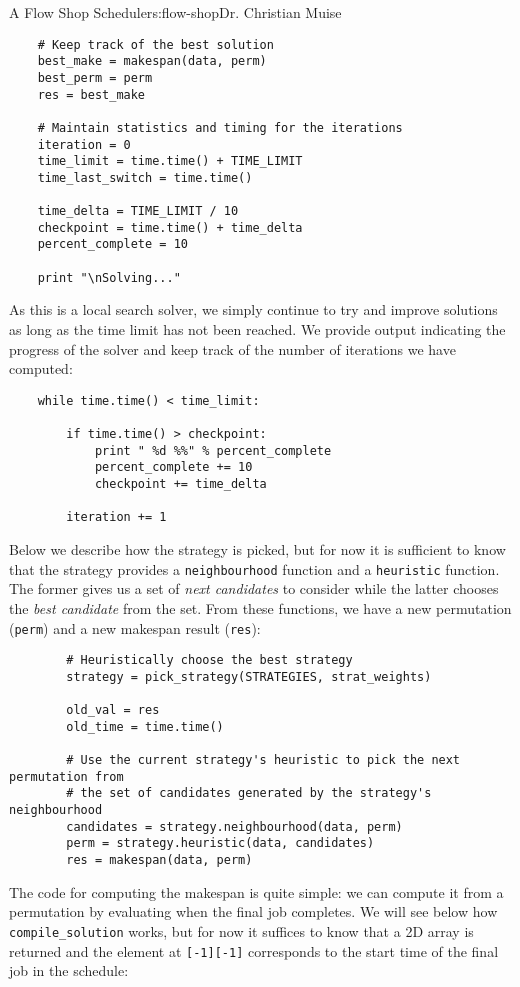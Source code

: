 \begin{aosachapter}{A Flow Shop Scheduler}{s:flow-shop}{Dr. Christian Muise}
\begin{verbatim}
    # Keep track of the best solution
    best_make = makespan(data, perm)
    best_perm = perm
    res = best_make

    # Maintain statistics and timing for the iterations
    iteration = 0
    time_limit = time.time() + TIME_LIMIT
    time_last_switch = time.time()

    time_delta = TIME_LIMIT / 10
    checkpoint = time.time() + time_delta
    percent_complete = 10

    print "\nSolving..."
\end{verbatim}

As this is a local search solver, we simply continue to try and improve
solutions as long as the time limit has not been reached. We provide
output indicating the progress of the solver and keep track of the
number of iterations we have computed:

\begin{verbatim}
    while time.time() < time_limit:

        if time.time() > checkpoint:
            print " %d %%" % percent_complete
            percent_complete += 10
            checkpoint += time_delta

        iteration += 1
\end{verbatim}

Below we describe how the strategy is picked, but for now it is
sufficient to know that the strategy provides a \texttt{neighbourhood}
function and a \texttt{heuristic} function. The former gives us a set of
\emph{next candidates} to consider while the latter chooses the
\emph{best candidate} from the set. From these functions, we have a new
permutation (\texttt{perm}) and a new makespan result (\texttt{res}):

\begin{verbatim}
        # Heuristically choose the best strategy
        strategy = pick_strategy(STRATEGIES, strat_weights)

        old_val = res
        old_time = time.time()

        # Use the current strategy's heuristic to pick the next permutation from
        # the set of candidates generated by the strategy's neighbourhood
        candidates = strategy.neighbourhood(data, perm)
        perm = strategy.heuristic(data, candidates)
        res = makespan(data, perm)
\end{verbatim}

The code for computing the makespan is quite simple: we can compute it
from a permutation by evaluating when the final job completes. We will
see below how \texttt{compile\_solution} works, but for now it suffices
to know that a 2D array is returned and the element at
\texttt{{[}-1{]}{[}-1{]}} corresponds to the start time of the final job
in the schedule:


\end{aosachapter}
